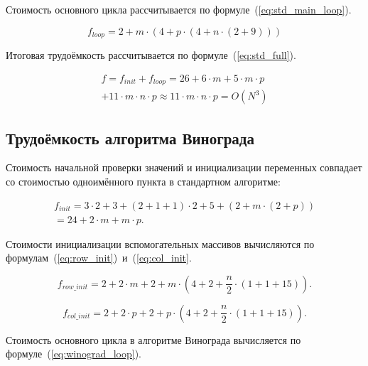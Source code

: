 Стоимость основного цикла рассчитывается по формуле~(\ref{eq:std_main_loop}).

\begin{equation}
    \label{eq:std_main_loop}
    f_{loop} = 2 + m \cdot(4 + p \cdot (4 + n \cdot (2 + 9)))
\end{equation}

Итоговая трудоёмкость рассчитывается по формуле~(\ref{eq:std_full}).

\begin{equation}
    \label{eq:std_full}
    \begin{gathered}
        f = f_{init} + f_{loop} = 26 + 6\cdot m + 5 \cdot m \cdot p \\
        + 11 \cdot m \cdot n \cdot p \approx 11 \cdot m \cdot n \cdot p = O(N^3)
    \end{gathered}
\end{equation}

\subsection{Трудоёмкость алгоритма Винограда}

Стоимость начальной проверки значений и инициализации переменных совпадает со стоимостью одноимённого пункта в стандартном алгоритме:

\begin{equation}
    \label{eq:winograd_init}
    \begin{gathered}
        f_{init} = 3 \cdot 2 + 3 + (2 + 1 + 1) \cdot 2 + 5 + (2 + m \cdot (2 + p)) \\
        = 24 + 2 \cdot m + m \cdot p.
    \end{gathered} 
\end{equation}

Стоимости инициализации вспомогательных массивов вычисляются по формулам~(\ref{eq:row_init})~и~(\ref{eq:col_init}.

\begin{equation}
    \label{eq:row_init}
    f_{row\_init} = 2 + 2 \cdot m + 2 + m \cdot (4 + 2 + \frac{n}{2} \cdot (1 + 1 + 15)).
\end{equation}

\begin{equation}
    \label{eq:col_init}
    f_{col\_init} = 2 + 2 \cdot p + 2 + p \cdot (4 + 2 + \frac{n}{2} \cdot (1 + 1 + 15)).
\end{equation}

Стоимость основного цикла в алгоритме Винограда вычисляется по формуле~(\ref{eq:winograd_loop}).

